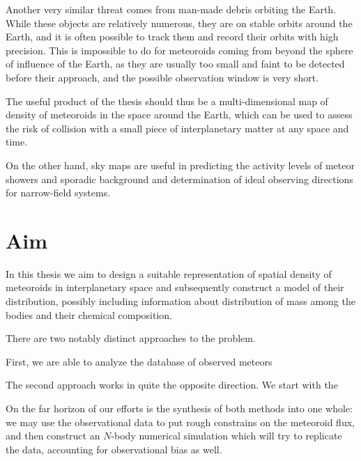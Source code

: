     Another very similar threat comes from man-made debris orbiting the Earth.
    While these objects are relatively numerous, they are on stable orbits around
    the Earth, and it is often possible to track them and record their orbits with high precision.
    This is impossible to do for meteoroids coming from beyond the sphere of influence of the Earth,
    as they are usually too small and faint to be detected before their approach, and the possible
    observation window is very short.

    The useful product of the thesis should thus be a multi-dimensional map of density
    of meteoroids in the space around the Earth, which can be used to assess the risk
    of collision with a small piece of interplanetary matter at any space and time.

    On the other hand, sky maps are useful in predicting the activity levels of
    meteor showers and sporadic background and determination of ideal observing
    directions for narrow-field systems.


\section{Aim}
    In this thesis we aim to design a suitable representation of spatial density of meteoroids
    in interplanetary space and subsequently construct a model of their distribution,
    possibly including information about distribution of mass among the bodies and their chemical composition.

    There are two notably distinct approaches to the problem.

    First, we are able to analyze the database of observed meteors

    The second approach works in quite the opposite direction. We start with the 

    On the far horizon of our efforts is the synthesis of both methods into one whole:
    we may use the observational data to put rough constrains on the meteoroid flux,
    and then construct an $N$-body numerical simulation which will try to replicate the data,
    accounting for observational bias as well.
